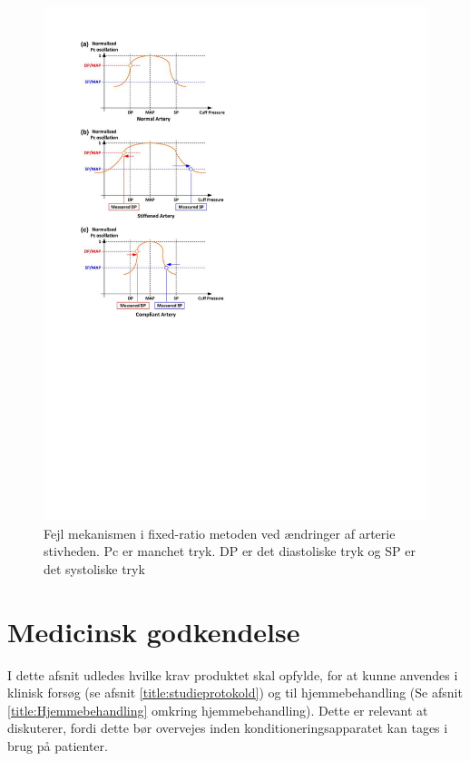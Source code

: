 \begin{minipage}[t]{0.5\textwidth}
	\begin{figure}[H]
		\centering
		\includegraphics[width=1\textwidth]{billeder/ErrorFixed-Ratio.pdf}
		\caption{Fejl mekanismen i fixed-ratio metoden ved ændringer af arterie stivheden. Pc er manchet tryk. DP er det diastoliske tryk og SP er det systoliske tryk}\label{fig:ErrorMechanismOfFixedRatio}
	\end{figure}
\end{minipage}

\section{Medicinsk godkendelse} \label{title:medGodkendelse}
I dette afsnit udledes hvilke krav produktet skal opfylde, for at kunne anvendes i klinisk forsøg (se afsnit \ref{title:studieprotokold}) og til hjemmebehandling (Se afsnit \ref{title:Hjemmebehandling} omkring hjemmebehandling). Dette er relevant at diskuterer, fordi dette bør overvejes inden konditioneringsapparatet kan tages i brug på patienter.

